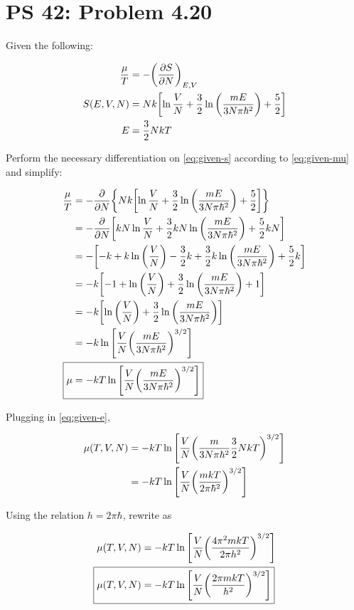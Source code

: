 \documentclass[12pt,a4paper]{article}
\begin{document}
\setcounter{page}{1}

\section*{PS 42: Problem 4.20}
\bigskip

Given the following:

\begin{align}
	\frac{\mu}{T} &= -\qty(\pdv{S}{N})_{E,V} \label{eq:given-mu} \\
	S(E,V,N) &= Nk\qty[\ln\frac{V}{N} + \frac{3}{2}\ln\qty(\frac{mE}{3N\pi\hbar^2}) + \frac{5}{2}] \label{eq:given-s} \\
	E &= \frac{3}{2}NkT \label{eq:given-e}
\end{align}

Perform the necessary differentiation on \eqref{eq:given-s} according to \eqref{eq:given-mu} and simplify:

\begin{align}
	\frac{\mu}{T} &= -\pdv{N} \qty{Nk\qty[\ln\frac{V}{N} + \frac{3}{2}\ln\qty(\frac{mE}{3N\pi\hbar^2}) + \frac{5}{2}]} \\
	&= -\pdv{N} \qty[kN\ln\frac{V}{N} + \frac{3}{2}kN\ln\qty(\frac{mE}{3N\pi\hbar^2}) + \frac{5}{2}kN] \\
	&= -\qty[-k + k\ln\qty(\frac{V}{N}) - \frac{3}{2}k + \frac{3}{2}k\ln\qty(\frac{mE}{3N\pi\hbar^2}) + \frac{5}{2}k] \\
	&= -k\qty[-1 + \ln\qty(\frac{V}{N}) + \frac{3}{2}\ln\qty(\frac{mE}{3N\pi\hbar^2}) + 1] \\
	&= -k\qty[\ln\qty(\frac{V}{N}) + \frac{3}{2}\ln\qty(\frac{mE}{3N\pi\hbar^2})] \\
	&= -k\ln\qty[\frac{V}{N}\qty(\frac{mE}{3N\pi\hbar^2})^{3/2}] \\
	\Aboxed{
		\mu &= -kT\ln\qty[\frac{V}{N}\qty(\frac{mE}{3N\pi\hbar^2})^{3/2}]
	} \label{eq:answer-1}
\end{align}

Plugging in \eqref{eq:given-e},

\begin{align}
	\mu(T,V,N) &= -kT\ln\qty[\frac{V}{N}\qty(\frac{m}{3N\pi\hbar^2}\frac{3}{2}NkT)^{3/2}] \\
	&= -kT\ln\qty[\frac{V}{N}\qty(\frac{mkT}{2\pi\hbar^2})^{3/2}]
\end{align}

Using the relation $h = 2\pi\hbar$, rewrite as

\begin{align}
	\mu(T,V,N) &= -kT\ln\qty[\frac{V}{N}\qty(\frac{4\pi^2 mkT}{2\pi h^2})^{3/2}] \\
	\Aboxed{
		\mu(T,V,N) &= -kT\ln\qty[\frac{V}{N}\qty(\frac{2\pi mkT}{h^2})^{3/2}]
	} \label{eq:answer-2}
\end{align}
\end{document}
